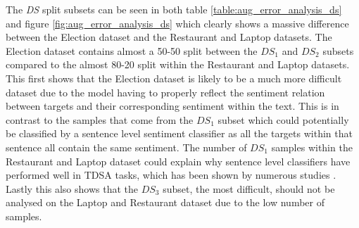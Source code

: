 The \textit{DS} split subsets can be seen in both table \ref{table:aug_error_analysis_ds} and figure \ref{fig:aug_error_analysis_ds} which clearly shows a massive difference between the Election dataset and the Restaurant and Laptop datasets. The Election dataset contains almost a 50-50 split between the $DS_1$ and $DS_2$ subsets compared to the almost 80-20 split within the Restaurant and Laptop datasets. This first shows that the Election dataset is likely to be a much more difficult dataset due to the model having to properly reflect the sentiment relation between targets and their corresponding sentiment within the text. This is in contrast to the samples that come from the $DS_1$ subset which could potentially be classified by a sentence level sentiment classifier as all the targets within that sentence all contain the same sentiment. The number of $DS_1$ samples within the Restaurant and Laptop dataset could explain why sentence level classifiers have performed well in TDSA tasks, which has been shown by numerous studies \citep{methods_tang-etal-2016-aspect,wang-etal-2016-attention,he-etal-2018-exploiting,methods_jiang-etal-2019-challenge}. Lastly this also shows that the $DS_3$ subset, the most difficult, should not be analysed on the Laptop and Restaurant dataset due to the low number of samples. 
\begin{figure}[h!]
    \begin{floatrow}
    \end{floatrow}
\end{figure}

